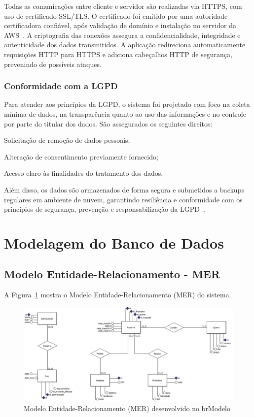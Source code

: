 \documentclass[
	12pt,				%
	openany,			%
	twoside,			%
	a4paper,			%
	english,			%
	french,				%
	spanish,			%
	brazil				%
	]{abntex2}
\begin{document}
Todas as comunicações entre cliente e servidor são realizadas via HTTPS, com uso de certificado SSL/TLS. O certificado foi emitido por uma autoridade certificadora confiável, após validação de domínio e instalação no servidor da AWS~\cite{aws-doc}. A criptografia das conexões assegura a confidencialidade, integridade e autenticidade dos dados transmitidos.
A aplicação redireciona automaticamente requisições HTTP para HTTPS e adiciona cabeçalhos HTTP de segurança, prevenindo de possíveis ataques.


\subsubsection{Conformidade com a LGPD}
Para atender aos princípios da LGPD, o sistema foi projetado com foco na coleta mínima de dados, na transparência quanto ao uso das informações e no controle por parte do titular dos dados. São assegurados os seguintes direitos:

Solicitação de remoção de dados pessoais;

Alteração de consentimento previamente fornecido;

Acesso claro às finalidades do tratamento dos dados.

Além disso, os dados são armazenados de forma segura e submetidos a backups regulares em ambiente de nuvem, garantindo resiliência e conformidade com os princípios de segurança, prevenção e responsabilização da LGPD~\cite{lgpd}.


\section{Modelagem do Banco de Dados}
\subsection{Modelo Entidade-Relacionamento - MER}

A Figura~\ref{fig:mer} mostra o Modelo Entidade-Relacionamento (MER) do sistema.

\begin{figure}[h!]
	\centering
	\includegraphics[width=\textwidth]{0406-MER.jpg}
	\caption{Modelo Entidade-Relacionamento (MER) desenvolvido no brModelo}
	\label{fig:mer}
\end{figure}
\end{document}
